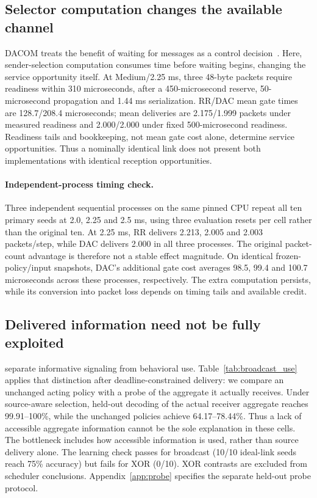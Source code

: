 \documentclass[10pt]{article}
\begin{document}
\subsection{Selector computation changes the available channel}
DACOM treats the benefit of waiting for messages as a control decision~\citep{yuan2023dacom}. Here, sender-selection computation consumes time before waiting begins, changing the service opportunity itself. At Medium/2.25 ms, three 48-byte packets require readiness within 310 microseconds, after a 450-microsecond reserve, 50-microsecond propagation and 1.44 ms serialization. RR/DAC mean gate times are 128.7/208.4 microseconds; mean deliveries are 2.175/1.999 packets under measured readiness and 2.000/2.000 under fixed 500-microsecond readiness. Readiness tails and bookkeeping, not mean gate cost alone, determine service opportunities. Thus a nominally identical link does not present both implementations with identical reception opportunities.

\paragraph{Independent-process timing check.}
Three independent sequential processes on the same pinned CPU repeat all ten primary seeds at 2.0, 2.25 and 2.5 ms, using three evaluation resets per cell rather than the original ten. At 2.25 ms, RR delivers 2.213, 2.005 and 2.003 packets/step, while DAC delivers 2.000 in all three processes. The original packet-count advantage is therefore not a stable effect magnitude. On identical frozen-policy/input snapshots, DAC's additional gate cost averages 98.5, 99.4 and 100.7 microseconds across these processes, respectively. The extra computation persists, while its conversion into packet loss depends on timing tails and available credit.

\subsection{Delivered information need not be fully exploited}
\citet{lowe2019pitfalls} separate informative signaling from behavioral use. Table~\ref{tab:broadcast_use} applies that distinction after deadline-constrained delivery: we compare an unchanged acting policy with a probe of the aggregate it actually receives. Under source-aware selection, held-out decoding of the actual receiver aggregate reaches 99.91--100\%, while the unchanged policies achieve 64.17--78.44\%. Thus a lack of accessible aggregate information cannot be the sole explanation in these cells. The bottleneck includes how accessible information is used, rather than source delivery alone. The learning check passes for broadcast (10/10 ideal-link seeds reach 75\% accuracy) but fails for XOR (0/10). XOR contrasts are excluded from scheduler conclusions. Appendix~\ref{app:probe} specifies the separate held-out probe protocol.
\end{document}
